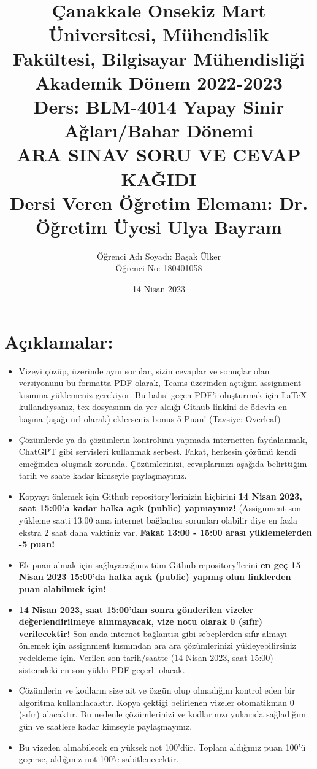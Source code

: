 \documentclass[11pt]{article}
\title{Çanakkale Onsekiz Mart Üniversitesi, Mühendislik Fakültesi, Bilgisayar Mühendisliği Akademik Dönem 2022-2023\\
Ders: BLM-4014 Yapay Sinir Ağları/Bahar Dönemi\\ 
ARA SINAV SORU VE CEVAP KAĞIDI\\
Dersi Veren Öğretim Elemanı: Dr. Öğretim Üyesi Ulya Bayram}
\author{%
\begin{minipage}{\textwidth}
\raggedright
Öğrenci Adı Soyadı: Başak Ülker\\ %
Öğrenci No: 180401058
\end{minipage}%
}
\date{14 Nisan 2023}
\begin{document}
\maketitle

\vspace{-.5in}
\section*{Açıklamalar:}
\begin{itemize}
    \item Vizeyi çözüp, üzerinde aynı sorular, sizin cevaplar ve sonuçlar olan versiyonunu bu formatta PDF olarak, Teams üzerinden açtığım assignment kısmına yüklemeniz gerekiyor. Bu bahsi geçen PDF'i oluşturmak için LaTeX kullandıysanız, tex dosyasının da yer aldığı Github linkini de ödevin en başına (aşağı url olarak) eklerseniz bonus 5 Puan! (Tavsiye: Overleaf)
    \item Çözümlerde ya da çözümlerin kontrolünü yapmada internetten faydalanmak, ChatGPT gibi servisleri kullanmak serbest. Fakat, herkesin çözümü kendi emeğinden oluşmak zorunda. Çözümlerinizi, cevaplarınızı aşağıda belirttiğim tarih ve saate kadar kimseyle paylaşmayınız. 
    \item Kopyayı önlemek için Github repository'lerinizin hiçbirini \textbf{14 Nisan 2023, saat 15:00'a kadar halka açık (public) yapmayınız!} (Assignment son yükleme saati 13:00 ama internet bağlantısı sorunları olabilir diye en fazla ekstra 2 saat daha vaktiniz var. \textbf{Fakat 13:00 - 15:00 arası yüklemelerden -5 puan!}
    \item Ek puan almak için sağlayacağınız tüm Github repository'lerini \textbf{en geç 15 Nisan 2023 15:00'da halka açık (public) yapmış olun linklerden puan alabilmek için!}
    \item \textbf{14 Nisan 2023, saat 15:00'dan sonra gönderilen vizeler değerlendirilmeye alınmayacak, vize notu olarak 0 (sıfır) verilecektir!} Son anda internet bağlantısı gibi sebeplerden sıfır almayı önlemek için assignment kısmından ara ara çözümlerinizi yükleyebilirsiniz yedekleme için. Verilen son tarih/saatte (14 Nisan 2023, saat 15:00) sistemdeki en son yüklü PDF geçerli olacak.
    \item Çözümlerin ve kodların size ait ve özgün olup olmadığını kontrol eden bir algoritma kullanılacaktır. Kopya çektiği belirlenen vizeler otomatikman 0 (sıfır) alacaktır. Bu nedenle çözümlerinizi ve kodlarınızı yukarıda sağladığım gün ve saatlere kadar kimseyle paylaşmayınız.
    \item Bu vizeden alınabilecek en yüksek not 100'dür. Toplam aldığınız puan 100'ü geçerse, aldığınız not 100'e sabitlenecektir.

\end{itemize}
\end{document}
